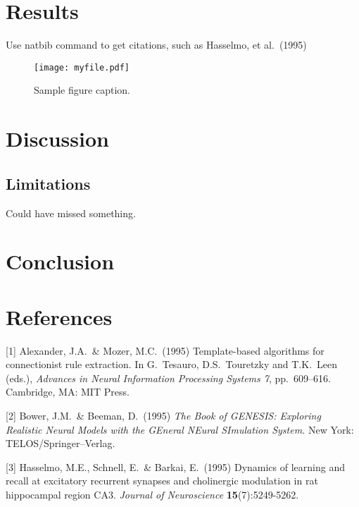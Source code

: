 \documentclass{article}
\begin{document}
\section{Results}
\label{results}

Use natbib command \citet{hasselmo} to get citations, such as  Hasselmo, et al.\ (1995)


\begin{figure}
  \centering
   \texttt{[image: myfile.pdf]}
  \caption{Sample figure caption.}
\end{figure}

\section{Discussion}

\subsection{Limitations}
Could have missed something.

\section{Conclusion}


\section*{References}

[1] Alexander, J.A.\ \& Mozer, M.C.\ (1995) Template-based algorithms for
connectionist rule extraction. In G.\ Tesauro, D.S.\ Touretzky and T.K.\ Leen
(eds.), {\it Advances in Neural Information Processing Systems 7},
pp.\ 609--616. Cambridge, MA: MIT Press.

[2] Bower, J.M.\ \& Beeman, D.\ (1995) {\it The Book of GENESIS: Exploring
  Realistic Neural Models with the GEneral NEural SImulation System.}  New York:
TELOS/Springer--Verlag.

[3] Hasselmo, M.E., Schnell, E.\ \& Barkai, E.\ (1995) Dynamics of learning and
recall at excitatory recurrent synapses and cholinergic modulation in rat
hippocampal region CA3. {\it Journal of Neuroscience} {\bf 15}(7):5249-5262.
\end{document}
